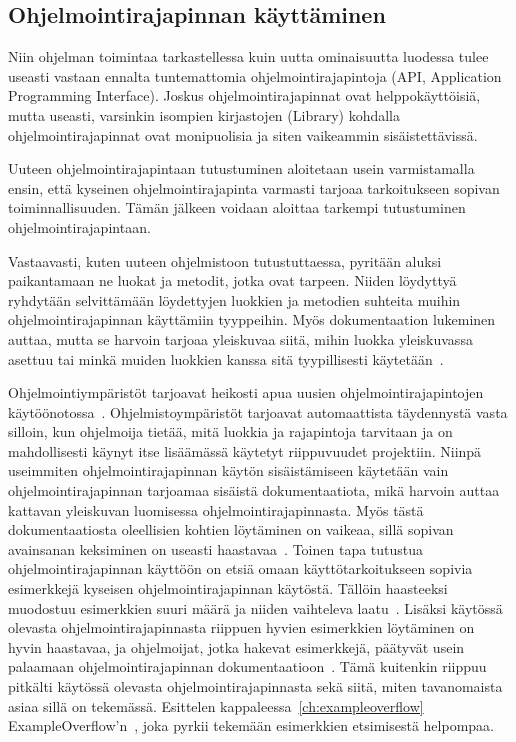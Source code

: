 \documentclass[finnish]{tktltiki2}
\theoremstyle{definition}
\theoremstyle{remark}
\begin{document}
\subsection{Ohjelmointirajapinnan käyttäminen}
Niin ohjelman toimintaa tarkastellessa kuin uutta ominaisuutta luodessa tulee useasti vastaan ennalta tuntemattomia ohjelmointirajapintoja (API, Application Programming Interface).
Joskus ohjelmointirajapinnat ovat helppokäyttöisiä, mutta useasti, varsinkin isompien kirjastojen (Library) kohdalla ohjelmointirajapinnat ovat monipuolisia ja siten vaikeammin sisäistettävissä.

Uuteen ohjelmointirajapintaan tutustuminen aloitetaan usein varmistamalla ensin, että kyseinen ohjelmointirajapinta varmasti tarjoaa tarkoitukseen sopivan toiminnallisuuden. Tämän jälkeen voidaan aloittaa tarkempi tutustuminen ohjelmointirajapintaan.

Vastaavasti, kuten uuteen ohjelmistoon tutustuttaessa, pyritään aluksi paikantamaan ne luokat ja metodit, jotka ovat tarpeen. Niiden löydyttyä ryhdytään selvittämään löydettyjen luokkien ja metodien suhteita muihin ohjelmointirajapinnan käyttämiin tyyppeihin. Myös dokumentaation lukeminen auttaa, mutta se harvoin tarjoaa yleiskuvaa siitä, mihin luokka yleiskuvassa asettuu tai minkä muiden luokkien kanssa sitä tyypillisesti käytetään~\cite{asking-and-answering-api-questions}.

Ohjelmointiympäristöt tarjoavat heikosti apua uusien ohjelmointirajapintojen käytöönotossa~\cite{jungloid-mining}. Ohjelmistoympäristöt tarjoavat automaattista täydennystä vasta silloin, kun ohjelmoija tietää, mitä luokkia ja rajapintoja tarvitaan ja on mahdollisesti käynyt itse lisäämässä käytetyt riippuvuudet projektiin. Niinpä useimmiten ohjelmointirajapinnan käytön sisäistämiseen käytetään vain ohjelmointirajapinnan tarjoamaa sisäistä dokumentaatiota, mikä harvoin auttaa kattavan yleiskuvan luomisessa ohjelmointirajapinnasta. Myös tästä dokumentaatiosta oleellisien kohtien löytäminen on vaikeaa, sillä sopivan avainsanan keksiminen on useasti haastavaa~\cite{what-to-search-for}.
Toinen tapa tutustua ohjelmointirajapinnan käyttöön on etsiä omaan käyttötarkoitukseen sopivia esimerkkejä kyseisen ohjelmointirajapinnan käytöstä. Tällöin haasteeksi muodostuu esimerkkien suuri määrä ja niiden vaihteleva laatu~\cite{example-overflow-social-media-for-code-recommendations}. Lisäksi käytössä olevasta ohjelmointirajapinnasta riippuen hyvien esimerkkien löytäminen on hyvin haastavaa, ja ohjelmoijat, jotka hakevat esimerkkejä, päätyvät usein palaamaan ohjelmointirajapinnan dokumentaatioon~\cite{asking-and-answering-api-questions}. Tämä kuitenkin riippuu pitkälti käytössä olevasta ohjelmointirajapinnasta sekä siitä, miten tavanomaista asiaa sillä on tekemässä. Esittelen kappaleessa~\ref{ch:exampleoverflow} ExampleOverflow'n~\cite{example-overflow-social-media-for-code-recommendations}, joka pyrkii tekemään esimerkkien etsimisestä helpompaa.
\end{document}
